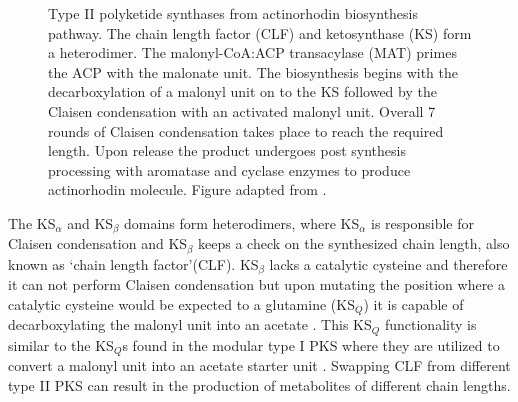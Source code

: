 			\setlength\fboxsep{5pt}
			\setlength\fboxrule{1.5pt}
			\begin{figure} []
			\centering
			\caption[Type II polyketide synthases from actinorhodin biosynthesis pathway]{Type II polyketide synthases from actinorhodin biosynthesis pathway. The chain length factor (CLF) and ketosynthase (KS) form a heterodimer. The malonyl-CoA:ACP transacylase (MAT) primes the ACP with the malonate unit. The biosynthesis begins with the decarboxylation of a malonyl unit on to the KS followed by the Claisen condensation with an activated malonyl unit. Overall 7 rounds of Claisen condensation takes place to reach the required length. Upon release the product undergoes post synthesis processing with aromatase and cyclase enzymes to produce actinorhodin molecule. Figure adapted from \parencite{Das2009}.}
			\label{fig:ACT}
			\end{figure}
						
			The KS$_{\alpha}$ and KS$_{\beta}$ domains form heterodimers, where KS$_{\alpha}$ is responsible for Claisen condensation and KS$_{\beta}$ keeps a check on the synthesized chain length, also known as \textquoteleft chain length factor\textquoteright (CLF).  KS$_{\beta}$ lacks a catalytic cysteine and therefore it can not perform Claisen condensation but upon mutating the position where a catalytic cysteine would be expected to a glutamine (KS$_Q $) it is capable of decarboxylating the malonyl unit into an acetate \parencite{Keatinge-Clay2004a}. This KS$_Q$ functionality is similar to the KS$_Q$s found in the modular type I PKS where they are utilized to convert a malonyl unit into an acetate starter unit \parencite{Bisang1999}. Swapping CLF from different type II PKS can result in the production of metabolites of different chain lengths.
			
